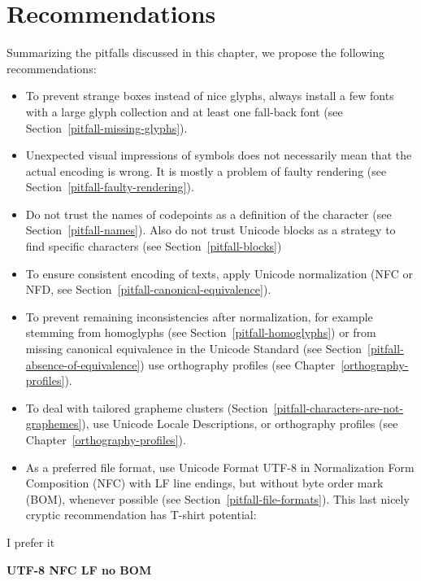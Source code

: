 \section{Recommendations}
\label{recommendations}

Summarizing the pitfalls discussed in this chapter, we propose the following 
recommendations:

\begin{itemize}
   \item To prevent strange boxes instead of nice glyphs, always install a few
         fonts with a large glyph collection and at least one fall-back font
         (see Section~\ref{pitfall-missing-glyphs}).
   \item Unexpected visual impressions of symbols does not necessarily mean that
         the actual encoding is wrong. It is mostly a problem of faulty
         rendering (see Section~\ref{pitfall-faulty-rendering}).
   \item Do not trust the names of codepoints as a definition of the character
         (see Section~\ref{pitfall-names}). Also do not trust Unicode blocks as
         a strategy to find specific characters (see
         Section~\ref{pitfall-blocks})
   \item To ensure consistent encoding of texts, apply Unicode normalization
         (NFC or NFD, see Section~\ref{pitfall-canonical-equivalence}).
   \item To prevent remaining inconsistencies after normalization, for example 
         stemming from homoglyphs (see Section~\ref{pitfall-homoglyphs}) 
         or from missing canonical equivalence in the Unicode Standard
         (see Section~\ref{pitfall-absence-of-equivalence})
         use orthography profiles (see Chapter~\ref{orthography-profiles}).
   \item To deal with tailored grapheme clusters
         (Section~\ref{pitfall-characters-are-not-graphemes}), use Unicode Locale 
         Descriptions, or orthography profiles 
         (see Chapter~\ref{orthography-profiles}).
   \item As a preferred file format, use Unicode Format UTF-8 in 
         Normalization Form Composition (NFC) with LF line endings, 
         but without byte order mark (BOM), whenever possible (see 
         Section~\ref{pitfall-file-formats}). This last nicely cryptic 
         recommendation has T-shirt potential:
  
\end{itemize}

\begin{center}
  I prefer it
  
  \textbf{UTF-8 NFC LF no BOM}
\end{center}


